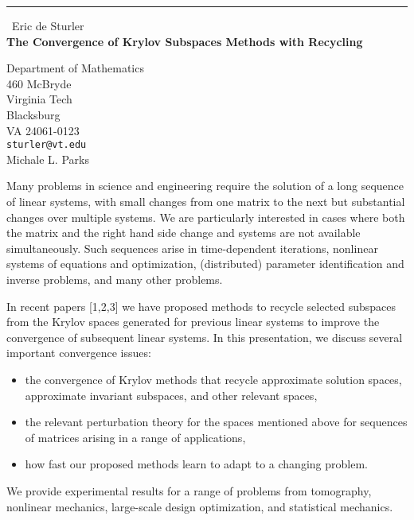 \documentclass{report}
\begin{document}
\begin{center}
\rule{6in}{1pt} \
{\large Eric de Sturler \\
{\bf The Convergence of Krylov Subspaces Methods with Recycling}}

Department of Mathematics \\ 460 McBryde \\ Virginia Tech \\ Blacksburg \\ VA 24061-0123
\\
{\tt sturler@vt.edu}\\
Michale L. Parks\end{center}

Many problems in science and engineering require the solution of a long
sequence of linear systems, with small changes from one matrix to the
next but substantial changes over multiple systems. We are particularly
interested in cases where both the matrix and the right hand side change
and systems are not available simultaneously. Such sequences arise in
time-dependent iterations, nonlinear systems of equations and
optimization, (distributed) parameter identification
and inverse problems, and many other problems.

In recent papers [1,2,3] we have
proposed methods to recycle selected subspaces from the Krylov
spaces generated for previous linear systems to improve the
convergence of subsequent linear systems. In this presentation, we
discuss several important convergence issues:
\begin{itemize}
\item the convergence of Krylov methods that recycle approximate
solution spaces, approximate invariant subspaces, and other relevant spaces,

\item the relevant perturbation theory for the spaces mentioned above for
sequences of matrices arising in a range of applications,

\item how fast our proposed methods learn to adapt to a changing
problem.
\end{itemize}
We provide experimental results for a range of problems from
tomography, nonlinear mechanics, large-scale design optimization, and
statistical mechanics.
\end{document}
